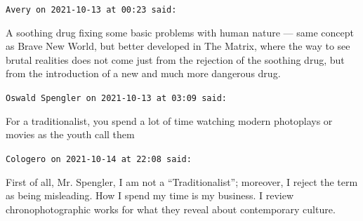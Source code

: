 \begin{footnotesize}
\begin{sffamily}
\texttt{Avery on 2021-10-13 at 00:23 said:}

A soothing drug fixing some basic problems with human nature --- same concept as Brave New World, but better developed in The Matrix, where the way to see brutal realities does not come just from the rejection of the soothing drug, but from the introduction of a new and much more dangerous drug.

\hfill

\texttt{Oswald Spengler on 2021-10-13 at 03:09 said:}

For a traditionalist, you spend a lot of time watching modern photoplays or movies as the youth call them

\hfill

\texttt{Cologero on 2021-10-14 at 22:08 said:}

First of all, Mr. Spengler, I am not a ``Traditionalist''; moreover, I reject the term as being misleading. How I spend my time is my business. I review chronophotographic works for what they reveal about contemporary culture.


\hfill

\end{sffamily}
\end{footnotesize}

